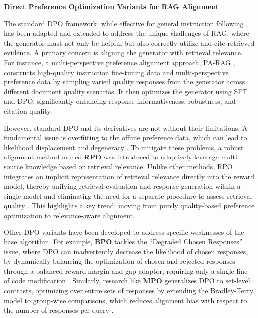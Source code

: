 \documentclass[11pt]{article}
\begin{document}
\textbf{Direct Preference Optimization Variants for RAG Alignment}

The standard DPO framework, while effective for general instruction following \cite{ref253,ref254}, has been adapted and extended to address the unique challenges of RAG, where the generator must not only be helpful but also correctly utilize and cite retrieved evidence. A primary concern is aligning the generator with retrieval relevance. For instance, a multi-perspective preference alignment approach, PA-RAG \cite{ref255}, constructs high-quality instruction fine-tuning data and multi-perspective preference data by sampling varied quality responses from the generator across different document quality scenarios. It then optimizes the generator using SFT and DPO, significantly enhancing response informativeness, robustness, and citation quality.

However, standard DPO and its derivatives are not without their limitations. A fundamental issue is overfitting to the offline preference data, which can lead to likelihood displacement and degeneracy \cite{ref256,ref257}. To mitigate these problems, a robust alignment method named \textbf{RPO} was introduced to adaptively leverage multi-source knowledge based on retrieval relevance. Unlike other methods, RPO integrates an implicit representation of retrieval relevance directly into the reward model, thereby unifying retrieval evaluation and response generation within a single model and eliminating the need for a separate procedure to assess retrieval quality \cite{ref258}. This highlights a key trend: moving from purely quality-based preference optimization to relevance-aware alignment.

Other DPO variants have been developed to address specific weaknesses of the base algorithm. For example, \textbf{BPO} tackles the ``Degraded Chosen Responses'' issue, where DPO can inadvertently decrease the likelihood of chosen responses, by dynamically balancing the optimization of chosen and rejected responses through a balanced reward margin and gap adaptor, requiring only a single line of code modification \cite{ref259}. Similarly, research like \textbf{MPO} generalizes DPO to set-level contrasts, optimizing over entire sets of responses by extending the Bradley-Terry model to group-wise comparisons, which reduces alignment bias with respect to the number of responses per query \cite{ref260}.
\end{document}
